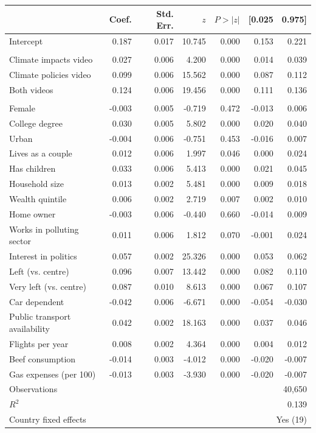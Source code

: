\begin{tabular}{lrrrrrr}
\toprule
 & Coef. & Std. Err. & $z$ & $P>|z|$ & [0.025 & 0.975] \\
\midrule
Intercept & 0.187 & 0.017 & 10.745 & 0.000 & 0.153 & 0.221 \\
\addlinespace
\multicolumn{7}{l}{\textit{Treatment arms (base: control)}}\\
Climate impacts video & 0.027 & 0.006 & 4.200 & 0.000 & 0.014 & 0.039 \\
Climate policies video & 0.099 & 0.006 & 15.562 & 0.000 & 0.087 & 0.112 \\
Both videos & 0.124 & 0.006 & 19.456 & 0.000 & 0.111 & 0.136 \\
\addlinespace
\multicolumn{7}{l}{\textit{Pre-treatment controls}}\\
Female & -0.003 & 0.005 & -0.719 & 0.472 & -0.013 & 0.006 \\
College degree & 0.030 & 0.005 & 5.802 & 0.000 & 0.020 & 0.040 \\
Urban & -0.004 & 0.006 & -0.751 & 0.453 & -0.016 & 0.007 \\
Lives as a couple & 0.012 & 0.006 & 1.997 & 0.046 & 0.000 & 0.024 \\
Has children & 0.033 & 0.006 & 5.413 & 0.000 & 0.021 & 0.045 \\
Household size & 0.013 & 0.002 & 5.481 & 0.000 & 0.009 & 0.018 \\
Wealth quintile & 0.006 & 0.002 & 2.719 & 0.007 & 0.002 & 0.010 \\
Home owner & -0.003 & 0.006 & -0.440 & 0.660 & -0.014 & 0.009 \\
Works in polluting sector & 0.011 & 0.006 & 1.812 & 0.070 & -0.001 & 0.024 \\
Interest in politics & 0.057 & 0.002 & 25.326 & 0.000 & 0.053 & 0.062 \\
Left (vs. centre) & 0.096 & 0.007 & 13.442 & 0.000 & 0.082 & 0.110 \\
Very left (vs. centre) & 0.087 & 0.010 & 8.613 & 0.000 & 0.067 & 0.107 \\
Car dependent & -0.042 & 0.006 & -6.671 & 0.000 & -0.054 & -0.030 \\
Public transport availability & 0.042 & 0.002 & 18.163 & 0.000 & 0.037 & 0.046 \\
Flights per year & 0.008 & 0.002 & 4.364 & 0.000 & 0.004 & 0.012 \\
Beef consumption & -0.014 & 0.003 & -4.012 & 0.000 & -0.020 & -0.007 \\
Gas expenses (per 100) & -0.013 & 0.003 & -3.930 & 0.000 & -0.020 & -0.007 \\
\addlinespace
Observations & \multicolumn{6}{r}{40,650}\\
$R^2$ & \multicolumn{6}{r}{0.139}\\
Country fixed effects & \multicolumn{6}{r}{Yes (19)}\\
\bottomrule
\end{tabular}
